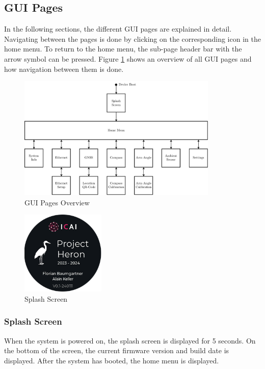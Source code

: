 \subsection{GUI Pages}
In the following sections, the different GUI pages are explained in detail.
Navigating between the pages is done by clicking on the corresponding icon in the home menu.
To return to the home menu, the sub-page header bar with the arrow symbol can be pressed.
Figure \ref{fig:gui_pages_overview} shows an overview of all GUI pages and how navigation between them is done.
\begin{figure}[h]
	\centering
	\vspace{-0.5cm}
	\includegraphics[width=0.85\textwidth]{images/6_design_final/final_design_gui_pages.pdf}
	\caption{GUI Pages Overview}
	\label{fig:gui_pages_overview}
\end{figure}
\vspace{-0.3cm}

\begin{minipage}{\linewidth}
	\begin{figure}
		\vspace{-0.6cm}
		\includegraphics[width=4cm]{images/6_design_final/gui/00_splash_screen.png}
		\centering
		\caption{Splash Screen}
		\label{fig:final_design_gui_splash_screen}
	\end{figure}
	\subsubsection{Splash Screen}
	When the system is powered on, the splash screen is displayed for 5 seconds.
	On the bottom of the screen, the current firmware version and build date is displayed.
	After the system has booted, the home menu is displayed.
\end{minipage}
\vspace{2.2cm}		%

